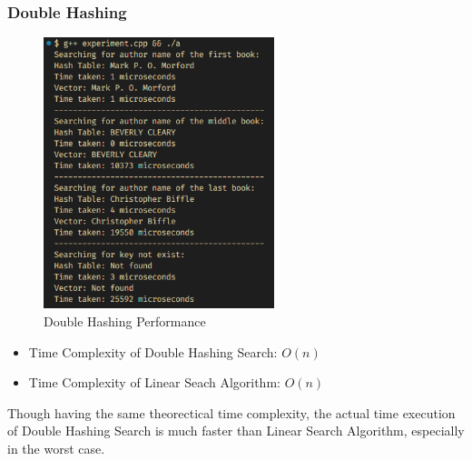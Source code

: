 \subsubsection*{Double Hashing}
\begin{figure}[H]
	\centering
	\includegraphics[width=0.6\textwidth]{images/double_hash/experiment.png}
	\caption{Double Hashing Performance}
\end{figure}
\begin{itemize}
	\item Time Complexity of Double Hashing Search: \(O(n)\)
	\item Time Complexity of Linear Seach Algorithm: \(O(n)\)
\end{itemize}
Though having the same theorectical time complexity, the actual time execution of Double Hashing Search is much faster than Linear Search Algorithm, especially in the worst case.
